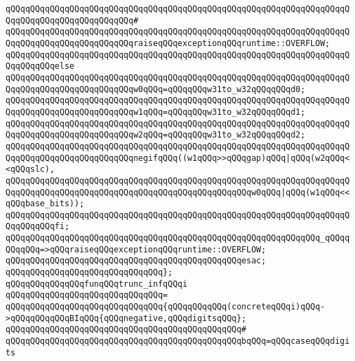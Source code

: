 \verb|qQQqqQQqqQQqqQQqqQQqqQQqqQQqqQQqqQQqqQQqqQQqqQQqqQQqqQQqqQQqqQQqqQQqqQQqqQQqqQQqqQQqqQQqqQQqqQQq#|\newline
\verb|qQQqqQQqqQQqqQQqqQQqqQQqqQQqqQQqqQQqqQQqqQQqqQQqqQQqqQQqqQQqqQQqqQQqqQQqqQQqqQQqqQQqqQQqqQQqqQQqraiseqQQqexceptionqQQqruntime::OVERFLOW;|\newline
\verb|qQQqqQQqqQQqqQQqqQQqqQQqqQQqqQQqqQQqqQQqqQQqqQQqqQQqqQQqqQQqqQQqqQQqqQQqqQQqqQQqelse|\newline
\verb|qQQqqQQqqQQqqQQqqQQqqQQqqQQqqQQqqQQqqQQqqQQqqQQqqQQqqQQqqQQqqQQqqQQqqQQqqQQqqQQqqQQqqQQqqQQqqQQqw0qQQq=qQQqqQQqw31to_w32qQQqqQQqd0;|\newline
\verb|qQQqqQQqqQQqqQQqqQQqqQQqqQQqqQQqqQQqqQQqqQQqqQQqqQQqqQQqqQQqqQQqqQQqqQQqqQQqqQQqqQQqqQQqqQQqqQQqw1qQQq=qQQqqQQqw31to_w32qQQqqQQqd1;|\newline
\verb|qQQqqQQqqQQqqQQqqQQqqQQqqQQqqQQqqQQqqQQqqQQqqQQqqQQqqQQqqQQqqQQqqQQqqQQqqQQqqQQqqQQqqQQqqQQqqQQqw2qQQq=qQQqqQQqw31to_w32qQQqqQQqd2;|\newline
\newline
\verb|qQQqqQQqqQQqqQQqqQQqqQQqqQQqqQQqqQQqqQQqqQQqqQQqqQQqqQQqqQQqqQQqqQQqqQQqqQQqqQQqqQQqqQQqqQQqqQQqnegifqQQq((w1qQQq>>qQQqgap)qQQq|\verb#|qQQq(w2qQQq<<qQQqslc),#\newline
\verb|qQQqqQQqqQQqqQQqqQQqqQQqqQQqqQQqqQQqqQQqqQQqqQQqqQQqqQQqqQQqqQQqqQQqqQQqqQQqqQQqqQQqqQQqqQQqqQQqqQQqqQQqqQQqqQQqqQQqqQQqw0qQQq|\verb#|qQQq(w1qQQq<<qQQqbase_bits));#\newline
\verb|qQQqqQQqqQQqqQQqqQQqqQQqqQQqqQQqqQQqqQQqqQQqqQQqqQQqqQQqqQQqqQQqqQQqqQQqqQQqqQQqfi;|\newline
\newline
\verb|qQQqqQQqqQQqqQQqqQQqqQQqqQQqqQQqqQQqqQQqqQQqqQQqqQQqqQQqqQQqqQQq_qQQqqQQqqQQq=>qQQqraiseqQQqexceptionqQQqruntime::OVERFLOW;|\newline
\verb|qQQqqQQqqQQqqQQqqQQqqQQqqQQqqQQqqQQqqQQqqQQqqQQqesac;|\newline
\verb|qQQqqQQqqQQqqQQqqQQqqQQqqQQqqQQq};|\newline
\newline
\verb|qQQqqQQqqQQqqQQqfunqQQqtrunc_infqQQqi|\newline
\verb|qQQqqQQqqQQqqQQqqQQqqQQqqQQqqQQq=|\newline
\verb|qQQqqQQqqQQqqQQqqQQqqQQqqQQqqQQq{qQQqqQQqqQQq(concreteqQQqi)qQQq->qQQqqQQqqQQqBIqQQq{qQQqnegative,qQQqdigitsqQQq};|\newline
\verb|qQQqqQQqqQQqqQQqqQQqqQQqqQQqqQQqqQQqqQQqqQQqqQQq#|\newline
\verb|qQQqqQQqqQQqqQQqqQQqqQQqqQQqqQQqqQQqqQQqqQQqqQQqbqQQq=qQQqcaseqQQqdigits|\newline
